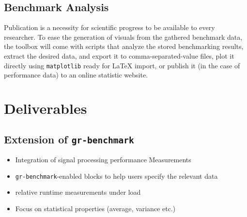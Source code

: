 \documentclass[a4paper]{IEEEtran}
\newcommand{\grbench}{\texttt{gr-benchmark}\xspace}
\begin{document}
\subsection{Benchmark Analysis}

Publication is a necessity for scientific progress to be available to every researcher.
To ease the generation of visuals from the gathered benchmark data, the toolbox will come 
with scripts that analyze the stored benchmarking results, extract the desired data, and 
export it to comma-separated-value files, plot it directly using \texttt{matplotlib} ready
for \LaTeX{} import, or publish it (in the case of performance data) to an online statistic website.

\section{Deliverables}
\subsection{Extension of \grbench}
\begin{itemize}
\item Integration of signal processing performance Measurements
\item \grbench-enabled blocks to help users specify the relevant data
\item relative runtime measurements under load
\item Focus on statistical properties (average, variance etc.)
\end{itemize}
\end{document}
